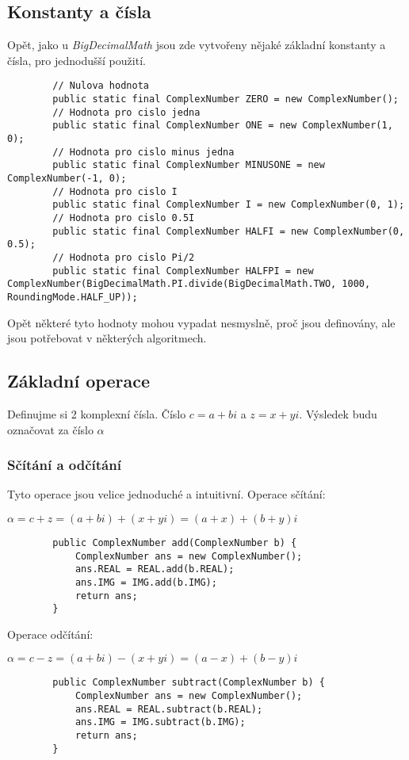 \documentclass{article}
\begin{document}
    \subsection{Konstanty a čísla}
    Opět, jako u \textit{BigDecimalMath} jsou zde vytvořeny nějaké základní konstanty a čísla, pro jednodušší
    použití.
    \begin{lstlisting}
        // Nulova hodnota
        public static final ComplexNumber ZERO = new ComplexNumber(); 
        // Hodnota pro cislo jedna
        public static final ComplexNumber ONE = new ComplexNumber(1, 0);
        // Hodnota pro cislo minus jedna
        public static final ComplexNumber MINUSONE = new ComplexNumber(-1, 0);
        // Hodnota pro cislo I
        public static final ComplexNumber I = new ComplexNumber(0, 1);
        // Hodnota pro cislo 0.5I
        public static final ComplexNumber HALFI = new ComplexNumber(0, 0.5);
        // Hodnota pro cislo Pi/2
        public static final ComplexNumber HALFPI = new ComplexNumber(BigDecimalMath.PI.divide(BigDecimalMath.TWO, 1000, RoundingMode.HALF_UP));
    \end{lstlisting}
    Opět některé tyto hodnoty mohou vypadat nesmyslně, proč jsou definovány, ale jsou potřebovat v některých algoritmech.
    \subsection{Základní operace}
    Definujme si 2 komplexní čísla. Číslo $c = a+bi$ a $z = x+yi$. Výsledek budu označovat za číslo $\alpha$
    \subsubsection{Sčítání a odčítání}
    Tyto operace jsou velice jednoduché a intuitivní.
    Operace sčítání:
    \begin{center}
        $\alpha = c+z = (a+bi)+(x+yi) = (a+x)+(b+y)i$
    \end{center}
    \begin{lstlisting}
        public ComplexNumber add(ComplexNumber b) {
            ComplexNumber ans = new ComplexNumber();
            ans.REAL = REAL.add(b.REAL);
            ans.IMG = IMG.add(b.IMG);
            return ans;
        }
    \end{lstlisting}
    Operace odčítání:
    \begin{center}
        $\alpha = c-z = (a+bi)-(x+yi) = (a-x)+(b-y)i$
    \end{center}
    \begin{lstlisting}
        public ComplexNumber subtract(ComplexNumber b) {
            ComplexNumber ans = new ComplexNumber();
            ans.REAL = REAL.subtract(b.REAL);
            ans.IMG = IMG.subtract(b.IMG);
            return ans;
        }
    \end{lstlisting}
\end{document}
